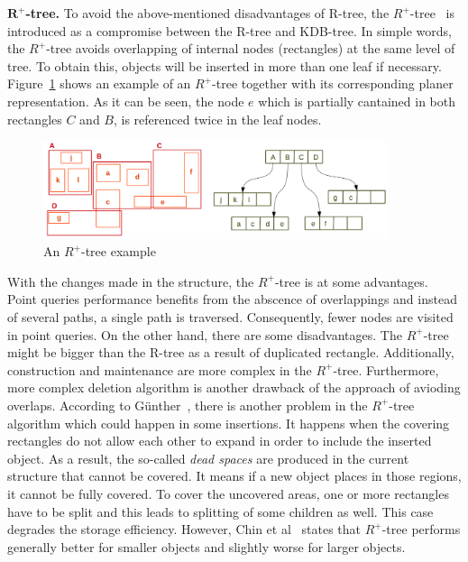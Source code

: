 \documentclass[a4paper,12pt]{article}
\begin{document}
\textbf{$\boldsymbol{R^+}$-tree.}
To avoid the above-mentioned disadvantages of R-tree, the $R^+$-tree~\cite{Sellis:rplustree} is introduced as a compromise between the R-tree and KDB-tree. In simple words, the $R^+$-tree avoids overlapping of internal nodes (rectangles) at the same level of tree. To obtain this, objects will be inserted in more than one leaf if necessary. Figure~\ref{r+tree} shows an example of an $R^+$-tree together with its corresponding planer representation. As it can be seen, the node $e$ which is partially cantained in both rectangles $C$ and $B$, is referenced twice in the leaf nodes.


\begin{figure}
\centering
\includegraphics[width=0.9\textwidth]{r+tree}
\caption{An {$R^+$-tree} example}
\label{r+tree}
\end{figure}

With the changes made in the structure, the $R^+$-tree is at some advantages. Point queries performance benefits from the abscence of overlappings and instead of several paths, a single path is traversed. Consequently, fewer nodes are visited in point queries. On the other hand, there are some disadvantages. 
The {$R^+$-tree} might be bigger than the R-tree as a result of duplicated rectangle. Additionally, construction and maintenance are more complex in the {$R^+$-tree}. Furthermore, more complex deletion algorithm is another drawback of the approach of avioding overlaps.  
According to G{\"u}nther~\cite{efficientstruct}, there is another problem in the {$R^+$-tree} algorithm which could happen in some insertions. It happens when the covering rectangles do not allow each other to expand in order to include the inserted object. As a result, the so-called \textit{dead spaces} are produced in the current structure that cannot be covered. It means if a new object places in those regions, it cannot be fully covered. To cover the uncovered areas, one or more rectangles have to be split and this leads to splitting of some children as well. This case degrades the storage efficiency. However, Chin et al~\cite{survey} states that {$R^+$-tree} performs generally better for smaller objects and slightly worse for larger objects.
\end{document}

